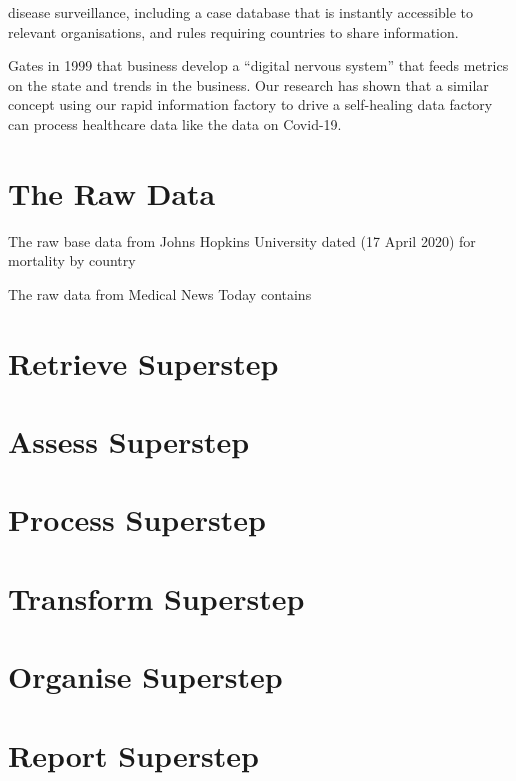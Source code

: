 
disease surveillance, including a case database that is instantly accessible to relevant organisations, and rules requiring countries to share information.

Gates in 1999 \cite{Gates1999}  that business develop a  “digital nervous system” that feeds metrics on the state and trends in the business. Our research has shown that a similar concept using our rapid information factory to drive a self-healing data factory can process healthcare data like the data on Covid-19.

\section{The Raw Data}

The raw base data from Johns Hopkins University dated (17 April 2020) for mortality by country \cite{jhumortality2020}

The raw data from Medical News Today \cite{medicalnews001} contains 




\section{Retrieve Superstep}



\section{Assess Superstep}

\section{Process Superstep}

\section{Transform Superstep}


\section{Organise Superstep}

\section{Report Superstep}


